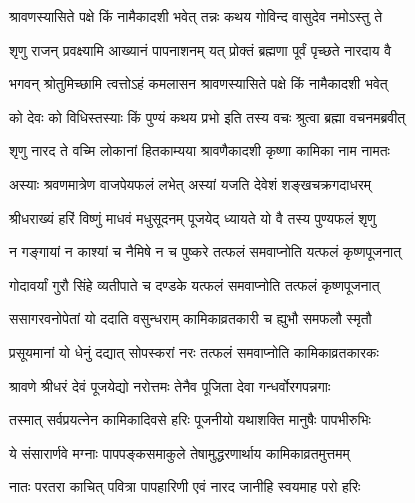 \label{sec:padma-shravana-krishna-kamika}

\ganapatyadiDhyanam
\padmaPuranam



\twolineshloka
{श्रावणस्यासिते पक्षे किं नामैकादशी भवेत्}
{तन्नः कथय गोविन्द वासुदेव नमोऽस्तु ते}%


\twolineshloka
{शृणु राजन् प्रवक्ष्यामि आख्यानं पापनाशनम्}
{यत् प्रोक्तं ब्रह्मणा पूर्वं पृच्छते नारदाय वै}%


\twolineshloka
{भगवन् श्रोतुमिच्छामि त्वत्तोऽहं कमलासन}
{श्रावणस्यासिते पक्षे किं नामैकादशी भवेत्}%

\twolineshloka
{को देवः को विधिस्तस्याः किं पुण्यं कथय प्रभो}
{इति तस्य वचः श्रुत्वा ब्रह्मा वचनमब्रवीत्}%


\twolineshloka
{शृणु नारद ते वच्मि लोकानां हितकाम्यया}
{श्रावणैकादशी कृष्णा कामिका नाम नामतः}%

\twolineshloka
{अस्याः श्रवणमात्रेण वाजपेयफलं लभेत्}
{अस्यां यजति देवेशं शङ्खचक्रगदाधरम्}%

\twolineshloka
{श्रीधराख्यं हरिं विष्णुं माधवं मधुसूदनम्}
{पूजयेद् ध्यायते यो वै तस्य पुण्यफलं शृणु}%

\twolineshloka
{न गङ्गायां न काश्यां च नैमिषे न च पुष्करे}
{तत्फलं समवाप्नोति यत्फलं कृष्णपूजनात्}%

\twolineshloka
{गोदावर्यां गुरौ सिंहे व्यतीपाते च दण्डके}
{यत्फलं समवाप्नोति तत्फलं कृष्णपूजनात्}%

\twolineshloka
{ससागरवनोपेतां यो ददाति वसुन्धराम्}
{कामिकाव्रतकारी च ह्युभौ समफलौ स्मृतौ}%

\twolineshloka
{प्रसूयमानां यो धेनुं दद्यात् सोपस्करां नरः}
{तत्फलं समवाप्नोति कामिकाव्रतकारकः}%

\twolineshloka
{श्रावणे श्रीधरं देवं पूजयेद्यो नरोत्तमः}
{तेनैव पूजिता देवा गन्धर्वोरगपन्नगाः}%

\twolineshloka
{तस्मात् सर्वप्रयत्नेन कामिकादिवसे हरिः}
{पूजनीयो यथाशक्ति मानुषैः पापभीरुभिः}%

\twolineshloka
{ये संसारार्णवे मग्नाः पापपङ्कसमाकुले}
{तेषामुद्धरणार्थाय कामिकाव्रतमुत्तमम्}%

\twolineshloka
{नातः परतरा काचित् पवित्रा पापहारिणी}
{एवं नारद जानीहि स्वयमाह परो हरिः}%

